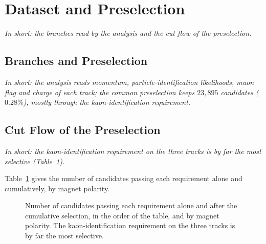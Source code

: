 \appendix
\makeatletter\renewcommand\subsection{}\makeatother
\makeatletter\renewcommand{}\makeatother

\newpage
\section{Dataset and Preselection}
\label{app:ext_data}
\emph{In short: the branches read by the analysis and the cut flow of the preselection.}

\subsection{Branches and Preselection}
\label{app:branches}
\emph{In short: the analysis reads momentum, particle-identification likelihoods, muon flag and charge of each track; the common preselection keeps $23{,}895$ candidates ($0.28\%$), mostly through the kaon-identification requirement.}

\subsection{Cut Flow of the Preselection}
\label{app:cutflow}
\emph{In short: the kaon-identification requirement on the three tracks is by far the most selective (Table~\ref{tab:cutflow}).}

Table~\ref{tab:cutflow} gives the number of candidates passing each requirement alone and cumulatively, by magnet polarity.

\begin{figure}[!t]
\makeatletter{}\makeatother
\centering
{}
\caption{Number of candidates passing each requirement alone and after the cumulative selection, in the order of the table, and by magnet polarity. The kaon-identification requirement on the three tracks is by far the most selective.}
\label{tab:cutflow}
\end{figure}

